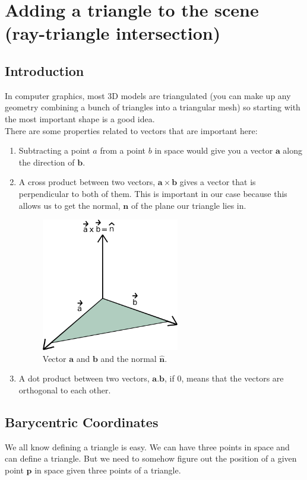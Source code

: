 \documentclass[11pt,a4paper]{article}
\begin{document}
	\section{Adding a triangle to the scene (ray-triangle intersection)}
	\subsection{Introduction}
	In computer graphics, most 3D models are triangulated (you can make up any geometry combining a bunch of triangles into a triangular mesh) so starting with the most important shape is a good idea.\\
	
	There are some properties related to vectors that are important here:
	\begin{enumerate}
		\item Subtracting a point $a$ from a point $b$ in space would give you a vector $\boldsymbol{a}$ along the direction of $\boldsymbol{b}$.
		\item A cross product between two vectors, $\boldsymbol{a} \times \boldsymbol{b}$  gives a vector that is perpendicular to both of them. This is important in our case because this allows us to get the normal, $\boldsymbol{n}$ of the plane our triangle lies in.
		\begin{figure}[H]
			\centering
			\includegraphics[width=6cm]{axb_normal.png}
			\caption{\centering Vector $\boldsymbol{a}$ and $\boldsymbol{b}$ and the normal $\boldsymbol{\hat{n}}$.}
		\end{figure}
		\item A dot product between two vectors, $\boldsymbol{a}.\boldsymbol{b}$, if $0$, means that the vectors are orthogonal to each other.
	\end{enumerate}	

	\subsection{Barycentric Coordinates}
	We all know defining a triangle is easy. We can have three points in space and can define a triangle. But we need to somehow figure out the position of a given point $\boldsymbol{p}$ in space given three points of a triangle.
	
\end{document}
